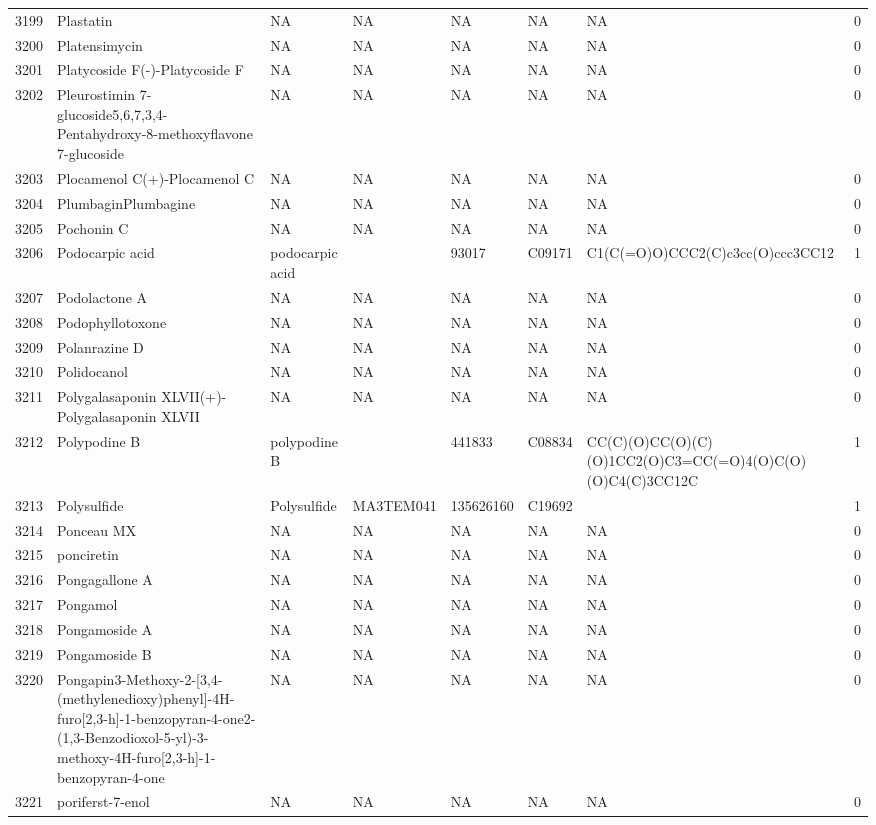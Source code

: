 \documentclass[a4paper]{article}
\begin{document}
\begin{longtable}{rlllllll}
  3199 & Plastatin & NA & NA & NA & NA & NA & 0 \\ 
  3200 & Platensimycin & NA & NA & NA & NA & NA & 0 \\ 
  3201 & Platycoside F(-)-Platycoside F & NA & NA & NA & NA & NA & 0 \\ 
  3202 & Pleurostimin 7-glucoside5,6,7,3,4-Pentahydroxy-8-methoxyflavone 7-glucoside & NA & NA & NA & NA & NA & 0 \\ 
  3203 & Plocamenol C(+)-Plocamenol C & NA & NA & NA & NA & NA & 0 \\ 
  3204 & PlumbaginPlumbagine & NA & NA & NA & NA & NA & 0 \\ 
  3205 & Pochonin C & NA & NA & NA & NA & NA & 0 \\ 
  3206 & Podocarpic acid & podocarpic acid &  & 93017 & C09171 & C1(C(=O)O)CCC2(C)c3cc(O)ccc3CC12 & 1 \\ 
  3207 & Podolactone A & NA & NA & NA & NA & NA & 0 \\ 
  3208 & Podophyllotoxone & NA & NA & NA & NA & NA & 0 \\ 
  3209 & Polanrazine D & NA & NA & NA & NA & NA & 0 \\ 
  3210 & Polidocanol & NA & NA & NA & NA & NA & 0 \\ 
  3211 & Polygalasaponin XLVII(+)-Polygalasaponin XLVII & NA & NA & NA & NA & NA & 0 \\ 
  3212 & Polypodine B & polypodine B &  & 441833 & C08834 & CC(C)(O)CC(O)(C)(O)1CC2(O)C3=CC(=O)4(O)C(O)(O)C4(C)3CC12C & 1 \\ 
  3213 & Polysulfide & Polysulfide & MA3TEM041 & 135626160 & C19692 &  & 1 \\ 
  3214 & Ponceau MX & NA & NA & NA & NA & NA & 0 \\ 
  3215 & ponciretin & NA & NA & NA & NA & NA & 0 \\ 
  3216 & Pongagallone A & NA & NA & NA & NA & NA & 0 \\ 
  3217 & Pongamol & NA & NA & NA & NA & NA & 0 \\ 
  3218 & Pongamoside A & NA & NA & NA & NA & NA & 0 \\ 
  3219 & Pongamoside B & NA & NA & NA & NA & NA & 0 \\ 
  3220 & Pongapin3-Methoxy-2-[3,4-(methylenedioxy)phenyl]-4H-furo[2,3-h]-1-benzopyran-4-one2-(1,3-Benzodioxol-5-yl)-3-methoxy-4H-furo[2,3-h]-1-benzopyran-4-one & NA & NA & NA & NA & NA & 0 \\ 
  3221 & poriferst-7-enol & NA & NA & NA & NA & NA & 0 \\ 

\end{longtable}
\end{document}
